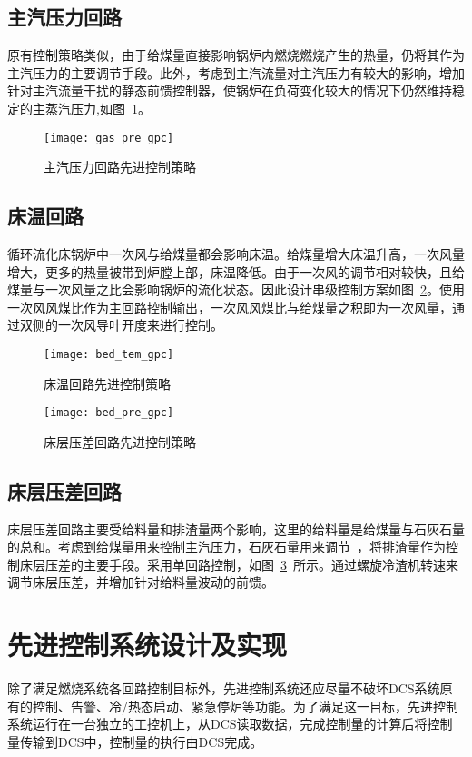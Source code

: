 \subsection{主汽压力回路}
原有控制策略类似，由于给煤量直接影响锅炉内燃烧燃烧产生的热量，仍将其作为主汽压力的主要调节手段。此外，考虑到主汽流量对主汽压力有较大的影响，增加针对主汽流量干扰的静态前馈控制器，使锅炉在负荷变化较大的情况下仍然维持稳定的主蒸汽压力,如图~\ref{fig:gas_pre_gpc}。
\begin{figure}[hbtp]
\centering
\texttt{[image: gas\_pre\_gpc]}
\caption{主汽压力回路先进控制策略} \label{fig:gas_pre_gpc}
\end{figure}
\subsection{床温回路}
循环流化床锅炉中一次风与给煤量都会影响床温。给煤量增大床温升高，一次风量增大，更多的热量被带到炉膛上部，床温降低。由于一次风的调节相对较快，且给煤量与一次风量之比会影响锅炉的流化状态。因此设计串级控制方案如图~\ref{fig:bed_tem_gpc}。使用一次风风煤比作为主回路控制输出，一次风风煤比与给煤量之积即为一次风量，通过双侧的一次风导叶开度来进行控制。
\begin{figure}[!hbt]
\centering
\texttt{[image: bed\_tem\_gpc]}
\caption{床温回路先进控制策略} \label{fig:bed_tem_gpc}
\end{figure}
\begin{figure}[!hbt]
\centering
\texttt{[image: bed\_pre\_gpc]}
\caption{床层压差回路先进控制策略} \label{fig:bed_pre_gpc}
\end{figure}
\subsection{床层压差回路}
床层压差回路主要受给料量和排渣量两个影响，这里的给料量是给煤量与石灰石量的总和。考虑到给煤量用来控制主汽压力，石灰石量用来调节~，将排渣量作为控制床层压差的主要手段。采用单回路控制，如图~\ref{fig:bed_pre_gpc}~所示。通过螺旋冷渣机转速来调节床层压差，并增加针对给料量波动的前馈。




\section{先进控制系统设计及实现}
除了满足燃烧系统各回路控制目标外，先进控制系统还应尽量不破坏DCS系统原有的控制、告警、冷/热态启动、紧急停炉等功能。为了满足这一目标，先进控制系统运行在一台独立的工控机上，从DCS读取数据，完成控制量的计算后将控制量传输到DCS中，控制量的执行由DCS完成。
